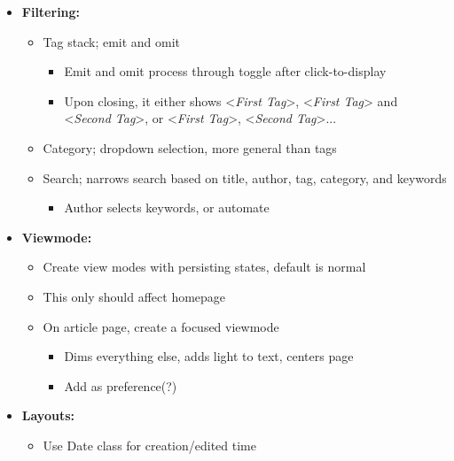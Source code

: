 \documentclass{article}
\begin{document}
{
  \begin{itemize}
    \item \textbf{Filtering:}
      \small
      \begin{itemize}[label=$\hookrightarrow$, leftmargin=3mm]
        \item Tag stack; emit and omit
          \begin{itemize}[label=$\hookrightarrow$, leftmargin=1.7mm]
            \item Emit and omit process through toggle after click-to-display
            \item Upon closing, it either shows <\textsl{First Tag}>, <\textsl{First Tag}> and <\textsl{Second Tag}>, or <\textsl{First Tag}>, <\textsl{Second Tag}>...
          \end{itemize}
        \item Category; dropdown selection, more general than tags
        \item Search; narrows search based on title, author, tag, category, and keywords
            \begin{itemize}[label=$\hookrightarrow$, leftmargin=1.7mm]
              \item Author selects keywords, or automate
            \end{itemize}
      \end{itemize}
      \normalsize
    \item \textbf{Viewmode:}
      \small 
      \begin{itemize}[label=$\hookrightarrow$, leftmargin=3mm]
        \item Create view modes with persisting states, default is normal 
        \item This only should affect homepage
        \item On article page, create a focused viewmode
          \begin{itemize}[label=$\hookrightarrow$, leftmargin=1.7mm]
            \item Dims everything else, adds light to text, centers page
            \item Add as preference(?)
          \end{itemize}
      \end{itemize}
      \normalsize
    \item \textbf{Layouts: }
      \small
      \begin{itemize}[label=$\hookrightarrow$, leftmargin=3mm]
        \item Use Date class for creation/edited time

\end{itemize}
\end{itemize}}
\end{document}
